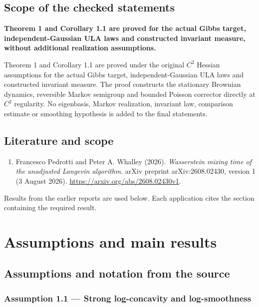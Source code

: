 \documentclass[11pt,a4paper]{report}
\begin{document}
\section*{Scope of the checked statements}


\textbf{Theorem 1 and Corollary 1.1 are proved for the actual Gibbs target, independent-Gaussian ULA laws and constructed invariant measure, without additional realization assumptions.}



Theorem 1 and Corollary 1.1 are proved under the original \(C^2\) Hessian assumptions for the actual Gibbs target, independent-Gaussian ULA laws and constructed invariant measure. The proof constructs the stationary Brownian dynamics, reversible Markov semigroup and bounded Poisson corrector directly at \(C^2\) regularity. No eigenbasis, Markov realization, invariant law, comparison estimate or smoothing hypothesis is added to the final statements.

\section*{Literature and scope}
\begin{enumerate}
\item Francesco Pedrotti and Peter A. Whalley (2026). \emph{Wasserstein mixing time of the unadjusted Langevin algorithm}. arXiv preprint arXiv:2608.02430, version 1 (3 August 2026). \url{https://arxiv.org/abs/2608.02430v1}.
\end{enumerate}
Results from the earlier reports \cite{LangevinLean2026ULASC,LangevinLean2026IPLA,LangevinLean2026Kinetic} are used below. Each application cites the section containing the required result.

\tableofcontents
\clearpage
{}
\chapter{Assumptions and main results}
\section*{Assumptions and notation from the source}
\subsection*{\texorpdfstring{Assumption 1.1 — Strong log-concavity and log-smoothness}{Assumption 1.1 — Strong log-concavity and log-smoothness}}
\end{document}

